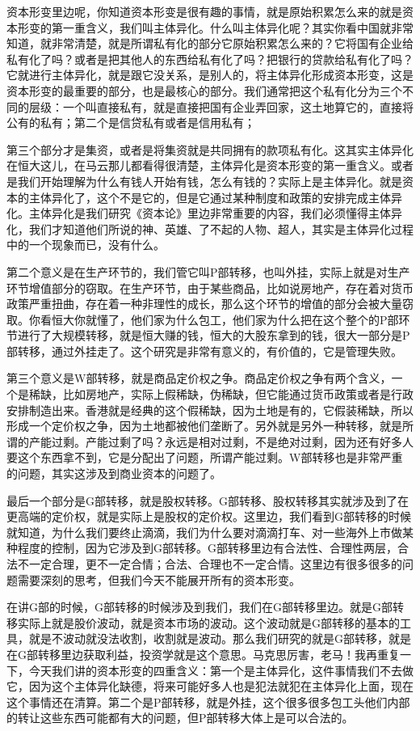 \documentclass[UTF8, 12pt, a4paper]{ctexrep}
\begin{document}
资本形变里边呢，你知道资本形变是很有趣的事情，就是原始积累怎么来的就是资本形变的第一重含义，我们叫主体异化。什么叫主体异化呢？其实你看中国就非常知道，就非常清楚，就是所谓私有化的部分它原始积累怎么来的？它将国有企业给私有化了吗？或者是把其他人的东西给私有化了吗？把银行的贷款给私有化了吗？它就进行主体异化，就是跟它没关系，是别人的，将主体异化形成资本形变，这是资本形变的最重要的部分，也是最核心的部分。我们通常把这个私有化分为三个不同的层级：一个叫直接私有，就是直接把国有企业弄回家，这土地算它的，直接将公有的私有；第二个是信贷私有或者是信用私有；

第三个部分才是集资，或者是将集资就是共同拥有的款项私有化。这其实主体异化在恒大这儿，在马云那儿都看得很清楚，主体异化是资本形变的第一重含义。或者是我们开始理解为什么有钱人开始有钱，怎么有钱的？实际上是主体异化。就是资本的主体异化了，这个不是它的，但是它通过某种制度和政策的安排完成主体异化。主体异化是我们研究《资本论》里边非常重要的内容，我们必须懂得主体异化，我们才知道他们所说的神、英雄、了不起的人物、超人，其实是主体异化过程中的一个现象而已，没有什么。

第二个意义是在生产环节的，我们管它叫P部转移，也叫外挂，实际上就是对生产环节增值部分的窃取。在生产环节，由于某些商品，比如说房地产，存在着对货币政策严重扭曲，存在着一种非理性的成长，那么这个环节的增值的部分会被大量窃取。你看恒大你就懂了，他们家为什么包工，他们家为什么把在这个整个的P部环节进行了大规模转移，就是恒大赚的钱，恒大的大股东拿到的钱，很大一部分是P部转移，通过外挂走了。这个研究是非常有意义的，有价值的，它是管理失败。

第三个意义是W部转移，就是商品定价权之争。商品定价权之争有两个含义，一个是稀缺，比如房地产，实际上假稀缺，伪稀缺，但它能通过货币政策或者是行政安排制造出来。香港就是经典的这个假稀缺，因为土地是有的，它假装稀缺，所以形成一个定价权之争，因为土地都被他们垄断了。另外就是另外一种转移，就是所谓的产能过剩。产能过剩了吗？永远是相对过剩，不是绝对过剩，因为还有好多人要这个东西拿不到，它是分配出了问题，所谓产能过剩。W部转移也是非常严重的问题，其实这涉及到商业资本的问题了。

最后一个部分是G部转移，就是股权转移。G部转移、股权转移其实就涉及到了在更高端的定价权，就是实际上是股权的定价权。这里边，我们看到G部转移的时候就知道，为什么我们要终止滴滴，我们为什么要对滴滴打车、对一些海外上市做某种程度的控制，因为它涉及到G部转移。G部转移里边有合法性、合理性两层，合法不一定合理，更不一定合情；合法、合理也不一定合情。这里边有很多很多的问题需要深刻的思考，但我们今天不能展开所有的资本形变。

在讲G部的时候，G部转移的时候涉及到我们，我们在G部转移里边。就是G部转移实际上就是股价波动，就是资本市场的波动。这个波动就是G部转移的基本的工具，就是不波动就没法收割，收割就是波动。那么我们研究的就是G部转移，就是在G部转移里边获取利益，投资学就是这个意思。马克思厉害，老马！我再重复一下，今天我们讲的资本形变的四重含义：第一个是主体异化，这件事情我们不去做它，因为这个主体异化缺德，将来可能好多人也是犯法就犯在主体异化上面，现在这个事情还在清算。第二个是P部转移，就是外挂，这个很多很多包工头他们内部的转让这些东西可能都有大的问题，但P部转移大体上是可以合法的。
\end{document}
